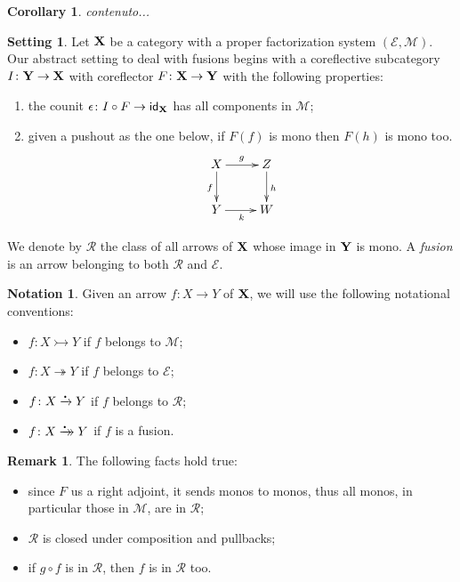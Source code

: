 \documentclass[a4paper]{article}
\newcommand{\id}[1]{\mathsf{id}_{#1}}
\newcommand{\xrightarrowdbl}[2][]{%
	\xrightarrow[#1]{#2}\mathrel{\mkern-14mu}\rightarrow
}
\newcommand{\mini}[0]{\scalebox{.4}{$\bullet$}}
\newcommand{\mto}[0]{\rightarrowtail}
\newcommand{\rto}[0]{\xrightarrow{\mini}}
\newcommand{\fto}[0]{\xrightarrowdbl{\mini}}
\newcommand{\eto}[0]{\twoheadrightarrow}
\def\X{\textbf {\textup{X}}}
\def\Y{\textbf {\textup{Y}}}
\newtheorem{corollary}[theorem]{Corollary}
\theoremstyle{definition}
\newtheorem*{notation}{Notation}
\newtheorem*{setting}{Setting}
\newtheorem{remark}[theorem]{Remark}
\begin{document}
\begin{corollary}
	contenuto...
\end{corollary}
\iffalse 
\begin{setting}Let $\X$ be a category with a proper factorization system $(\mathcal{E}, \mathcal{M})$. Our abstract setting to deal with fusions begins with a coreflective subcategory $I\colon \Y\to \X$ with coreflector $F\colon \X\to \Y$ with the following properties:
	\begin{enumerate}
		\item the counit $\epsilon \colon I\circ F\to \id{\X}$ has all components in $\mathcal{M}$; 
		\item given a pushout as the one below, if $F(f)$ is mono then $F(h)$ is mono too.
		\[\xymatrix{X \ar[r]^{g} \ar[d]_{f}& Z \ar[d]^{h}\\ Y\ar[r]_{k} & W}\]
	\end{enumerate}

We denote by $\mathcal{R}$ the class of all arrows of $\X$ whose image in $\Y$ is mono.  A \emph{fusion} is an arrow belonging to both $\mathcal{R}$ and $\mathcal{E}$.
 \end{setting}
 \begin{notation}
 	Given an arrow $f\colon X\to Y$ of $\X$, we will use the following notational conventions:
 	\begin{itemize}
 		\item $f\colon X\mto Y$ if $f$ belongs to $\mathcal{M}$;
 		\item $f\colon X\eto Y$ if $f$ belongs to $\mathcal{E}$;
 		\item $f\colon X \rto Y$ if $f$ belongs to $\mathcal{R}$;
 		\item $f\colon X \fto Y$ if $f$ is a fusion.
 	\end{itemize}
 \end{notation}
 
 \begin{remark}The following facts hold true:
 	\begin{itemize}
 		\item since $F$ us a right adjoint, it sends monos to monos, thus all monos, in particular those in $\mathcal{M}$, are in $\mathcal{R}$;
 		\item $\mathcal{R}$ is closed under composition and pullbacks;
 		\item if $g\circ f$ is in $\mathcal{R}$, then $f$ is in $\mathcal{R}$ too.
 	\end{itemize}
 \end{remark}
\end{document}
